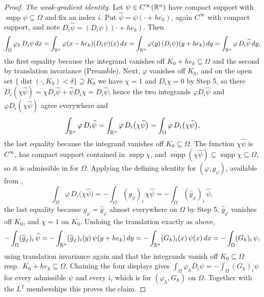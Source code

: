 \begin{proof}
\emph{The weak-gradient identity.}  Let $\psi\in C^\infty(\mathbb{R}^n)$ have compact
support with $\operatorname{supp}\psi\subseteq\Omega$ and fix an index $i$.  Put
$\widehat\psi=\psi(\cdot+he_k)$, again $C^\infty$ with compact support, and note
$D_i\widehat\psi=(D_i\psi)(\cdot+he_k)$.  Then
\[
\int_\Omega\varphi_h\,D_i\psi\,dx
=\int_{\mathbb{R}^n}\varphi(x-he_k)(D_i\psi)(x)\,dx
=\int_{\mathbb{R}^n}\varphi(y)\,(D_i\psi)(y+he_k)\,dy
=\int_{\mathbb{R}^n}\varphi\,D_i\widehat\psi\,dy ,
\]
the first equality because the integrand vanishes off $K_0+he_k\subseteq\Omega$
and the second by translation invariance (Preamble).  Next,
$\varphi$ vanishes off $K_0$, and on the open set
$\{\operatorname{dist}(\cdot,K_0)<\delta\}\supseteq K_0$ we have $\chi=1$ and
$D_i\chi=0$ by Step 5, so there
$D_i(\chi\widehat\psi)=\chi D_i\widehat\psi+\widehat\psi D_i\chi
=D_i\widehat\psi$; hence the two integrands $\varphi D_i\widehat\psi$ and
$\varphi D_i(\chi\widehat\psi)$ agree everywhere and
\[
\int_{\mathbb{R}^n}\varphi\,D_i\widehat\psi
=\int_{\mathbb{R}^n}\varphi\,D_i\bigl(\chi\widehat\psi\bigr)
=\int_\Omega\varphi\,D_i\bigl(\chi\widehat\psi\bigr) ,
\]
the last equality because the integrand vanishes off $K_0\subseteq\Omega$.  The
function $\chi\widehat\psi$ is $C^\infty$, has compact support contained in
$\operatorname{supp}\chi$, and $\operatorname{supp}(\chi\widehat\psi)\subseteq
\operatorname{supp}\chi\subseteq\Omega$, so it is admissible in
 for $\Omega$.  Applying the defining identity for
$(\varphi,g_\varphi)$, available from ,
\[
\int_\Omega\varphi\,D_i\bigl(\chi\widehat\psi\bigr)
=-\int_\Omega(g_\varphi)_i\,\chi\widehat\psi
=-\int_\Omega(\widehat g_\varphi)_i\,\widehat\psi ,
\]
the last equality because $g_\varphi=\widehat g_\varphi$ almost everywhere on
$\Omega$ by Step 5, $\widehat g_\varphi$ vanishes off $K_0$, and $\chi=1$ on
$K_0$.  Undoing the translation exactly as above,
\[
-\int_\Omega(\widehat g_\varphi)_i\,\widehat\psi
=-\int_{\mathbb{R}^n}(\widehat g_\varphi)_i(y)\,\psi(y+he_k)\,dy
=-\int_{\mathbb{R}^n}(G_h)_i(x)\,\psi(x)\,dx
=-\int_\Omega(G_h)_i\,\psi ,
\]
using translation invariance again and that the integrands vanish off
$K_0\subseteq\Omega$ resp.\ $K_0+he_k\subseteq\Omega$.  Chaining the four
displays gives
$\int_\Omega\varphi_h D_i\psi=-\int_\Omega(G_h)_i\psi$ for every admissible
$\psi$ and every $i$, which is  for
$(\varphi_h,G_h)$ on $\Omega$.  Together with the $L^2$ memberships this proves
the claim.


\end{proof}
